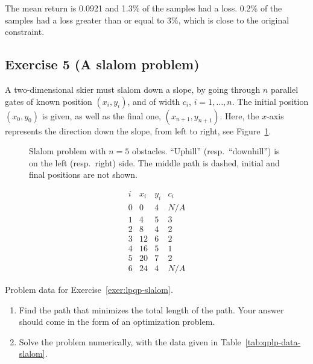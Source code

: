 \documentclass[11pt]{article}
\begin{document}
\begin{solution}
\begin{enumerate}
    The mean return is 0.0921 and 1.3\% of the samples had a loss. 0.2\% of the samples had a loss greater than or equal to 3\%, which is close to the original constraint.
\end{enumerate}
\end{solution}

\newpage
\subsection*{Exercise 5 (A slalom problem)}

A two-dimensional skier must slalom down a slope, by going through $n$ parallel gates of known position $(x_i,y_i)$, and of width $c_i$, $i=1,\ldots,n$. The initial position $(x_0,y_0)$ is given, as well as the final one, $(x_{n+1},y_{n+1})$. Here, the $x$-axis represents the direction down the slope, from left to right, see Figure~\ref{fig:slalom_pic.pdf}. \\


\begin{figure}[h]
\begin{center}
\end{center}
\caption{\label{fig:slalom_pic.pdf}  Slalom problem with $n=5$ obstacles. ``Uphill'' (resp.\ ``downhill'') is on the left (resp.\ right) side. The middle path is dashed, initial and final positions are not shown.}
\end{figure}

\begin{table}[h]
\begin{center}
\[
\begin{array}{c|ccc}
i & x_i & y_i & c_i \\\hline
0 & 0 & 4 & N/A \\
1 & 4 & 5 & 3 \\
2 & 8 & 4 & 2 \\
3 & 12 & 6 & 2 \\
4 & 16 & 5 & 1 \\
5 & 20 & 7 & 2 \\
6 & 24 & 4 & N/A
\end{array}
\]
\end{center}
\caption{Problem data for Exercise~\ref{exer:lpqp-slalom}.}
\label{tab:qplp-data-slalom}
\end{table}
\begin{enumerate}
\item Find the path that minimizes the total length of the path. Your answer should come in the form of an optimization problem.

\item Solve the problem numerically, with the data given in Table~\ref{tab:qplp-data-slalom}.
\end{enumerate}
\end{document}
